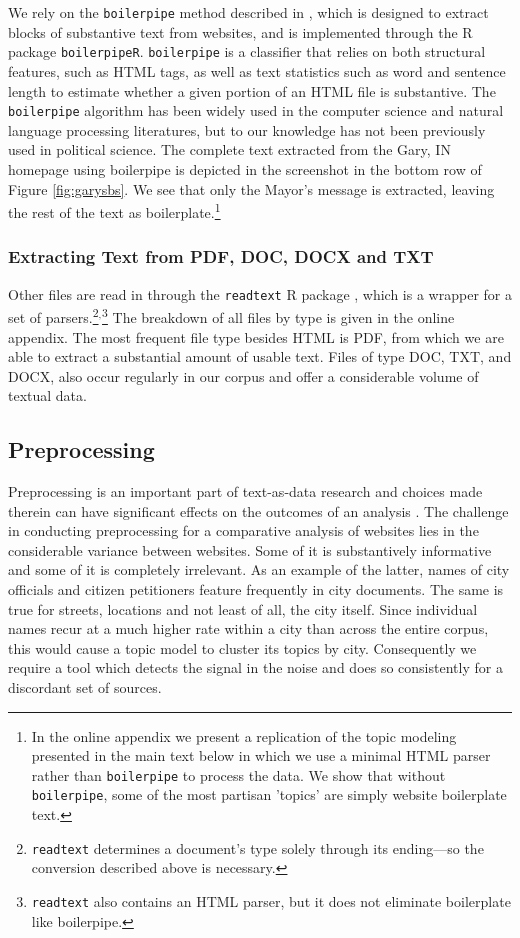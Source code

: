 \documentclass[11pt]{article}
\begin{document}
We rely on the \texttt{boilerpipe} method described in \cite{Kohlschutter2010}, which is designed to extract blocks of substantive text from websites, and is implemented through the R package \texttt{boilerpipeR}. \texttt{boilerpipe} is a classifier that relies on both structural features, such as HTML tags, as well as text statistics such as word and sentence length to estimate whether a given portion of an HTML file is substantive. The \texttt{boilerpipe} algorithm has been widely used in the computer science and natural language processing literatures, but to our knowledge has not been previously used in political science.   The complete text extracted from the Gary, IN homepage using boilerpipe is depicted in the screenshot in the bottom row of Figure \ref{fig:garysbs}. We see that only the Mayor's message is extracted, leaving the rest of the text as boilerplate.\footnote{In the online appendix we present a replication of the topic modeling presented in the main text below in which we use a minimal HTML parser rather than \texttt{boilerpipe} to process the data. We show that without \texttt{boilerpipe}, some of the most partisan 'topics' are simply website boilerplate text. }

\subsubsection{Extracting Text from PDF, DOC, DOCX and TXT}
Other files are read in through the \texttt{readtext} R package \citep{readtext}, which is a wrapper for a set of parsers.\footnote{\texttt{readtext} determines a document's type solely through its ending---so the conversion described above is necessary.}$^{,}$\footnote{\texttt{readtext} also contains an HTML parser, but it does not eliminate boilerplate like boilerpipe.} The breakdown of all files by type is given in the online appendix. The most frequent file type besides HTML is PDF, from which we are able to extract a substantial amount of usable text. Files of type DOC, TXT, and DOCX, also occur regularly in our corpus and offer a considerable volume of textual data.

\subsection{Preprocessing}
Preprocessing is an important part of text-as-data research and choices made therein can have significant effects on the outcomes of an analysis \citep{denny2018text}. The challenge in conducting preprocessing for a comparative analysis of websites lies in the considerable variance between websites. Some of it is substantively informative and some of it is completely irrelevant. As an example of the latter, names of city officials and citizen petitioners feature frequently in city documents. The same is true for streets, locations and not least of all, the city itself. Since individual names recur at a much higher rate within a city than across the entire corpus, this would cause a topic model to cluster its topics by city. Consequently we require a tool which detects the signal in the noise and does so consistently for a discordant set of sources.
\end{document}
